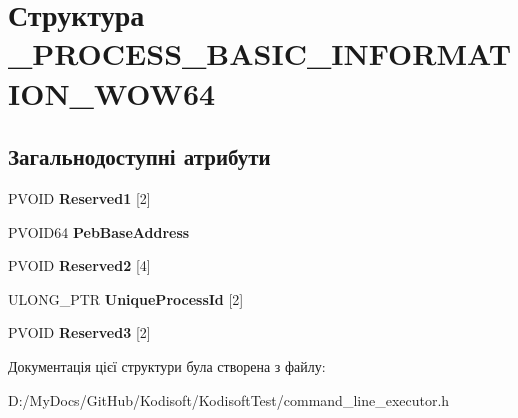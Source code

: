\hypertarget{struct___p_r_o_c_e_s_s___b_a_s_i_c___i_n_f_o_r_m_a_t_i_o_n___w_o_w64}{\section{Структура \+\_\+\+P\+R\+O\+C\+E\+S\+S\+\_\+\+B\+A\+S\+I\+C\+\_\+\+I\+N\+F\+O\+R\+M\+A\+T\+I\+O\+N\+\_\+\+W\+O\+W64}
\label{struct___p_r_o_c_e_s_s___b_a_s_i_c___i_n_f_o_r_m_a_t_i_o_n___w_o_w64}
}
\subsection*{Загальнодоступні атрибути}
\begin{DoxyCompactItemize}
\item 
\hypertarget{struct___p_r_o_c_e_s_s___b_a_s_i_c___i_n_f_o_r_m_a_t_i_o_n___w_o_w64_a76d2b713a1fc15eb28740b8d92c329a7}{P\+V\+O\+I\+D {\bfseries Reserved1} \mbox{[}2\mbox{]}}\label{struct___p_r_o_c_e_s_s___b_a_s_i_c___i_n_f_o_r_m_a_t_i_o_n___w_o_w64_a76d2b713a1fc15eb28740b8d92c329a7}

\item 
\hypertarget{struct___p_r_o_c_e_s_s___b_a_s_i_c___i_n_f_o_r_m_a_t_i_o_n___w_o_w64_ae608541a30cf81b28d987454f2a41d2d}{P\+V\+O\+I\+D64 {\bfseries Peb\+Base\+Address}}\label{struct___p_r_o_c_e_s_s___b_a_s_i_c___i_n_f_o_r_m_a_t_i_o_n___w_o_w64_ae608541a30cf81b28d987454f2a41d2d}

\item 
\hypertarget{struct___p_r_o_c_e_s_s___b_a_s_i_c___i_n_f_o_r_m_a_t_i_o_n___w_o_w64_a97857e0cf153a2b02267bf909aab37b3}{P\+V\+O\+I\+D {\bfseries Reserved2} \mbox{[}4\mbox{]}}\label{struct___p_r_o_c_e_s_s___b_a_s_i_c___i_n_f_o_r_m_a_t_i_o_n___w_o_w64_a97857e0cf153a2b02267bf909aab37b3}

\item 
\hypertarget{struct___p_r_o_c_e_s_s___b_a_s_i_c___i_n_f_o_r_m_a_t_i_o_n___w_o_w64_af871edc4d0bb2dee56c2464028739fda}{U\+L\+O\+N\+G\+\_\+\+P\+T\+R {\bfseries Unique\+Process\+Id} \mbox{[}2\mbox{]}}\label{struct___p_r_o_c_e_s_s___b_a_s_i_c___i_n_f_o_r_m_a_t_i_o_n___w_o_w64_af871edc4d0bb2dee56c2464028739fda}

\item 
\hypertarget{struct___p_r_o_c_e_s_s___b_a_s_i_c___i_n_f_o_r_m_a_t_i_o_n___w_o_w64_aa726c8cc84e924b0b0fddf1f34708526}{P\+V\+O\+I\+D {\bfseries Reserved3} \mbox{[}2\mbox{]}}\label{struct___p_r_o_c_e_s_s___b_a_s_i_c___i_n_f_o_r_m_a_t_i_o_n___w_o_w64_aa726c8cc84e924b0b0fddf1f34708526}

\end{DoxyCompactItemize}


Документація цієї структури була створена з файлу\+:\begin{DoxyCompactItemize}
\item 
D\+:/\+My\+Docs/\+Git\+Hub/\+Kodisoft/\+Kodisoft\+Test/command\+\_\+line\+\_\+executor.\+h\end{DoxyCompactItemize}

